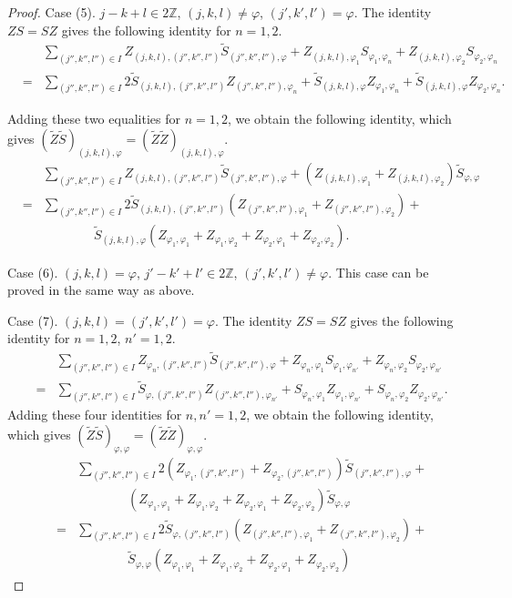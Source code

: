 \documentclass[11pt]{article}
\def\phi{\varphi}
\def\Z{{\mathbb Z}}
\begin{document}
\begin{proof}
Case (5).  $j-k+l\in2\Z$, $(j,k,l)\neq \phi$, $(j',k',l')=\phi$.
The identity $ZS=SZ$ gives the following identity for $n=1,2$.
\begin{eqnarray*}
&&\sum_{(j'',k'',l'')\in I} Z_{(j,k,l),(j'',k'',l'')}
\tilde S_{(j'',k'',l''),\phi}+
Z_{(j,k,l),\phi_1} S_{\phi_1,\phi_n}+
Z_{(j,k,l),\phi_2} S_{\phi_2,\phi_n}\\
&=&\sum_{(j'',k'',l'')\in I} 2\tilde S_{(j,k,l),(j'',k'',l'')}
Z_{(j'',k'',l''),\phi_n}+
\tilde S_{(j,k,l),\phi} Z_{\phi_1,\phi_n}+
\tilde S_{(j,k,l),\phi} Z_{\phi_2,\phi_n}.
\end{eqnarray*}

Adding these two equalities for $n=1,2$, we obtain the following
identity, which gives $(\tilde Z\tilde S)_{(j,k,l),\phi}
=(\tilde Z\tilde Z)_{(j,k,l),\phi}$.
\begin{eqnarray*}
&&\sum_{(j'',k'',l'')\in I} Z_{(j,k,l),(j'',k'',l'')}
\tilde S_{(j'',k'',l''),\phi}+
(Z_{(j,k,l),\phi_1}+Z_{(j,k,l),\phi_2}) \tilde S_{\phi,\phi}\\
&=&\sum_{(j'',k'',l'')\in I} 2\tilde S_{(j,k,l),(j'',k'',l'')}
(Z_{(j'',k'',l''),\phi_1}+Z_{(j'',k'',l''),\phi_2})+\\
&&\quad\quad\quad\quad\tilde S_{(j,k,l),\phi}
(Z_{\phi_1,\phi_1}+Z_{\phi_1,\phi_2}+Z_{\phi_2,\phi_1}+Z_{\phi_2,\phi_2}).
\end{eqnarray*}

Case (6).  $(j,k,l)=\phi$, $j'-k'+l'\in2\Z$, $(j',k',l')\neq \phi$.
This case can be proved in the same way as above.

Case (7).  $(j,k,l)=(j',k',l')=\phi$.
The identity $ZS=SZ$ gives the following identity for $n=1,2$, $n'=1,2$.
\begin{eqnarray*}
&&\sum_{(j'',k'',l'')\in I} Z_{\phi_n,(j'',k'',l'')}
\tilde S_{(j'',k'',l''),\phi}+
Z_{\phi_n,\phi_1} S_{\phi_1,\phi_{n'}}+
Z_{\phi_n,\phi_2} S_{\phi_2,\phi_{n'}}\\
&=&\sum_{(j'',k'',l'')\in I} \tilde S_{\phi,(j'',k'',l'')}
Z_{(j'',k'',l''),\phi_{n'}}+
S_{\phi_n,\phi_1} Z_{\phi_1,\phi_{n'}}+
S_{\phi_n,\phi_2} Z_{\phi_2,\phi_{n'}}.
\end{eqnarray*}
Adding these four identities for $n,n'=1,2$, we obtain the following
identity, which gives $(\tilde Z\tilde S)_{\phi,\phi}
=(\tilde Z\tilde Z)_{\phi,\phi}$.
\begin{eqnarray*}
&&\sum_{(j'',k'',l'')\in I} 
2(Z_{\phi_1,(j'',k'',l'')}+Z_{\phi_2,(j'',k'',l'')})
\tilde S_{(j'',k'',l''),\phi}+\\
&&\quad\quad\quad\quad
(Z_{\phi_1,\phi_1}+Z_{\phi_1,\phi_2}+Z_{\phi_2,\phi_1}+Z_{\phi_2,\phi_2})
\tilde S_{\phi,\phi}\\
&=&\sum_{(j'',k'',l'')\in I} 2\tilde S_{\phi,(j'',k'',l'')}
(Z_{(j'',k'',l''),\phi_1}+Z_{(j'',k'',l''),\phi_2})+\\
&&\quad\quad\quad\quad\tilde S_{\phi,\phi}
(Z_{\phi_1,\phi_1}+Z_{\phi_1,\phi_2}+Z_{\phi_2,\phi_1}+Z_{\phi_2,\phi_2})
\end{eqnarray*}
\end{proof}
\end{document}
